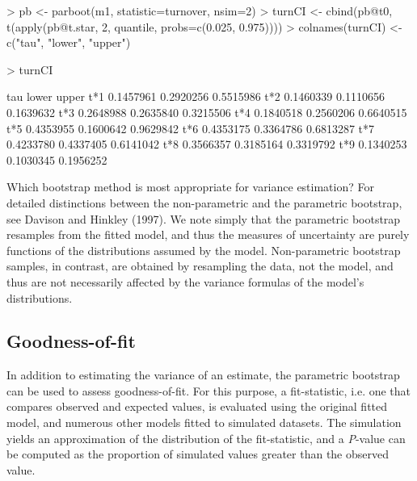 \documentclass[12pt]{article}
\renewenvironment{Schunk}{\vspace{\topsep}}{\vspace{\topsep}}
\begin{document}
\begin{small}


\begin{Schunk}
\begin{Sinput}
> pb <- parboot(m1, statistic=turnover, nsim=2)
> turnCI <- cbind(pb@t0,
     t(apply(pb@t.star, 2, quantile, probs=c(0.025, 0.975))))
> colnames(turnCI) <- c("tau", "lower", "upper")
\end{Sinput}
\end{Schunk}
\begin{Schunk}
\begin{Sinput}
> turnCI
\end{Sinput}
\begin{Soutput}
          tau     lower     upper
t*1 0.1457961 0.2920256 0.5515986
t*2 0.1460339 0.1110656 0.1639632
t*3 0.2648988 0.2635840 0.3215506
t*4 0.1840518 0.2560206 0.6640515
t*5 0.4353955 0.1600642 0.9629842
t*6 0.4353175 0.3364786 0.6813287
t*7 0.4233780 0.4337405 0.6141042
t*8 0.3566357 0.3185164 0.3319792
t*9 0.1340253 0.1030345 0.1956252
\end{Soutput}
\end{Schunk}


\end{small}


Which bootstrap method is most appropriate for variance estimation?
For detailed distinctions between the
non-parametric and the parametric bootstrap, see Davison and Hinkley
(1997). We note simply that the parametric bootstrap resamples from
the fitted model, and thus the
measures of uncertainty are purely
functions of the distributions assumed by the model. Non-parametric
bootstrap samples, in contrast, are obtained by resampling the
data, not the model, and thus are not necessarily affected by the
variance formulas of the model's distributions.



\subsection{Goodness-of-fit}


In addition to estimating the variance of an estimate, the parametric
bootstrap can be used to assess goodness-of-fit. For this purpose, a
fit-statistic, i.e. one that compares
observed and expected values, is evaluated using the original fitted
model, and numerous other models fitted to simulated datasets. The
simulation yields an approximation of
the distribution of the fit-statistic, and a \emph{P}-value
can be computed as the proportion of simulated values greater than the
observed value.
\end{document}
